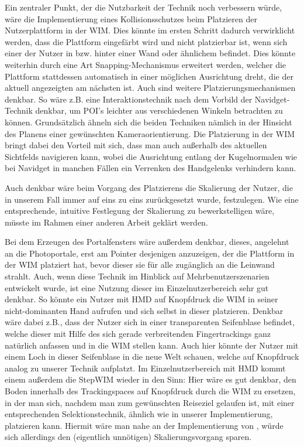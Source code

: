 Ein zentraler Punkt, der die Nutzbarkeit der Technik noch verbessern würde, wäre die Implementierung eines Kollisionsschutzes beim Platzieren der Nutzerplattform in der WIM. Dies könnte im ersten Schritt dadurch verwirklicht werden, dass die Plattform eingefärbt wird und nicht platzierbar ist, wenn sich einer der Nutzer in bzw. hinter einer Wand oder ähnlichem befindet. Dies könnte weiterhin durch eine Art \glqq Snapping\grqq{}-Mechanismus erweitert werden, welcher die Plattform stattdessen automatisch in einer möglichen Ausrichtung dreht, die der aktuell angezeigten am nächsten ist.
Auch sind weitere Platzierungsmechanismen denkbar. So wäre z.B. eine Interaktionstechnik nach dem Vorbild der Navidget-Technik \cite{HACHET2009225} denkbar, um POI's leichter aus verschiedenen Winkeln betrachten zu können. Grundsätzlich ähneln sich die beiden Techniken nämlich in der Hinsicht des Planens einer gewünschten Kameraorientierung. Die Platzierung in der WIM bringt dabei den Vorteil mit sich, dass man auch außerhalb des aktuellen Sichtfelds navigieren kann, wobei die Ausrichtung entlang der Kugelnormalen wie bei Navidget in manchen Fällen ein Verrenken des Handgelenks verhindern kann.

Auch denkbar wäre beim Vorgang des Platzierens die Skalierung der Nutzer, die in unserem Fall immer auf eins zu eins zurückgesetzt wurde, festzulegen. Wie eine entsprechende, intuitive Festlegung der Skalierung zu bewerkstelligen wäre, müsste im Rahmen einer anderen Arbeit geklärt werden.

Bei dem Erzeugen des Portalfensters wäre außerdem denkbar, dieses, angelehnt an die Photoportale, erst am Pointer desjenigen anzuzeigen, der die Plattform in der WIM platziert hat, bevor dieser sie für alle zugänglich an die Leinwand strahlt.
Auch, wenn diese Technik im Hinblick auf Mehrbenutzerszenarien entwickelt wurde, ist eine Nutzung dieser im Einzelnutzerbereich sehr gut denkbar. So könnte ein Nutzer mit HMD auf Knopfdruck die WIM in seiner nicht-dominanten Hand aufrufen und sich selbst in dieser platzieren. Denkbar wäre dabei z.B., dass der Nutzer sich in einer transparenten \glqq Seifenblase\grqq{} befindet, welche dieser mit Hilfe des sich gerade verbreitenden Fingertrackings ganz natürlich anfassen und in die WIM stellen kann. Auch hier könnte der Nutzer mit einem Loch in dieser \glqq Seifenblase\grqq{} in die neue Welt schauen, welche auf Knopfdruck analog zu unserer Technik \glqq aufplatzt\grqq{}. Im Einzelnutzerbereich mit HMD kommt einem außerdem die StepWIM\cite{Stoakley2010VirtualWIMb} wieder in den Sinn:
Hier wäre es gut denkbar, den Boden innerhalb des Trackingspaces auf Knopfdruck durch die WIM zu ersetzen, in der man sich, nachdem man zum gewünschten Reiseziel gelaufen ist, mit einer entsprechenden Selektionstechnik, ähnlich wie in unserer Implementierung, platzieren kann.
Hiermit wäre man nahe an der Implementierung von \cite{Krekhov2018GulliVRb}, würde sich allerdings den (eigentlich unnötigen) Skalierungsvorgang sparen.

